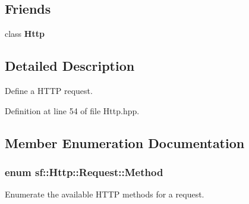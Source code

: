 \subsection*{Friends}
\begin{DoxyCompactItemize}
\item 
\hypertarget{classsf_1_1Http_1_1Request_aba95e2a7762bb5df986048b05d03a22e}{class {\bfseries Http}}\label{classsf_1_1Http_1_1Request_aba95e2a7762bb5df986048b05d03a22e}

\end{DoxyCompactItemize}


\subsection{Detailed Description}
Define a H\-T\-T\-P request. 

Definition at line 54 of file Http.\-hpp.



\subsection{Member Enumeration Documentation}
\hypertarget{classsf_1_1Http_1_1Request_a620f8bff6f43e1378f321bf53fbf5598}{
\subsubsection[{Method}]{\setlength{\rightskip}{0pt plus 5cm}enum {\bf sf\-::\-Http\-::\-Request\-::\-Method}}}\label{classsf_1_1Http_1_1Request_a620f8bff6f43e1378f321bf53fbf5598}


Enumerate the available H\-T\-T\-P methods for a request. 

